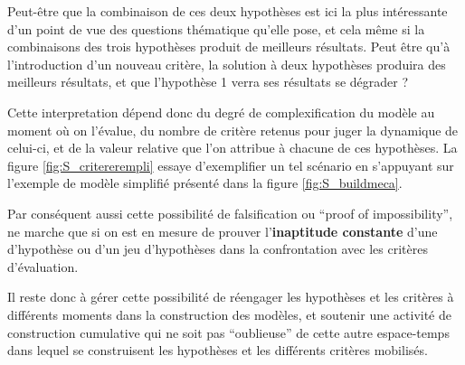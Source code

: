 Peut-être que la combinaison de ces deux hypothèses est ici la plus intéressante d'un point de vue des questions thématique qu'elle pose, et cela même si la combinaisons des trois hypothèses produit de meilleurs résultats. Peut être qu'à l'introduction d'un nouveau critère, la solution à deux hypothèses produira des meilleurs résultats, et que l'hypothèse 1 verra ses résultats se dégrader ? 

Cette interpretation dépend donc du degré de complexification du modèle au moment où on l'évalue, du nombre de critère retenus pour juger la dynamique de celui-ci, et de la valeur relative que l'on attribue à chacune de ces hypothèses. La figure \ref{fig:S_critererempli} essaye d'exemplifier un tel scénario en s'appuyant sur l'exemple de modèle simplifié présenté dans la figure \ref{fig:S_buildmeca}.

Par conséquent aussi cette possibilité de falsification ou \foreignquote{english}{proof of impossibility}, ne marche que si on est en mesure de prouver l'\textbf{inaptitude constante} d'une d'hypothèse ou d'un jeu d'hypothèses dans la confrontation avec les critères d’évaluation.

Il reste donc à gérer cette possibilité de réengager les hypothèses et les critères à différents moments dans la construction des modèles, et soutenir une activité de construction cumulative qui ne soit pas \enquote{oublieuse} de cette autre espace-temps dans lequel se construisent les hypothèses et les différents critères mobilisés. 

